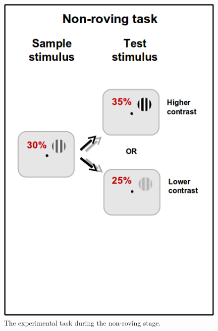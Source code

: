 \begin{figure}[htbp]
\begin{center}
\includegraphics[width=0.8\linewidth]{figs/info/PLtask2a.png}
\end{center}
\caption{The experimental task during the non-roving stage.}
\label{fig:pltask2}
\end{figure}


